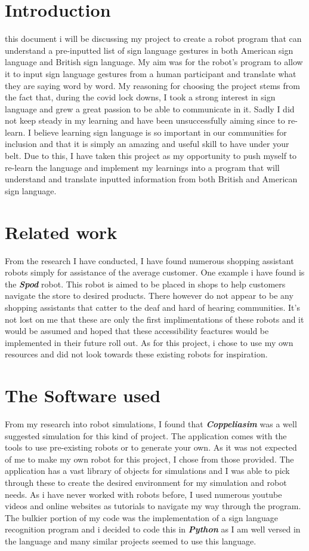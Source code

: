 \documentclass[lettersize,journal]{IEEEtran}
\begin{document}
\section{Introduction}
 this document i will be discussing my project to create a robot program that can understand a pre-inputted list of sign language gestures in both American sign language and British sign language. My aim was for the robot’s program to allow it to input sign language gestures from a human participant and translate what they are saying word by word. My reasoning for choosing the project stems from the fact that, during the covid lock downs, I took a strong interest in sign language and grew a great passion to be able to communicate in it. Sadly I did not keep steady in my learning and have been unsuccessfully aiming since to re-learn. I believe learning sign language is so important in our communities for inclusion and that it is simply an amazing and useful skill to have under your belt. Due to this, I have taken this project as my opportunity to push myself to re-learn the language and implement my learnings into a program that will understand and translate inputted information from both British and American sign language.  

\section{Related work}
From the research I have conducted, I have found numerous shopping assistant robots simply for assistance of the average customer. One example i have found is the \textbf{\textit{Spod}} robot. This robot is aimed to be placed in shops to help customers navigate the store to desired products. There however do not appear to be any shopping assistants that catter to the deaf and hard of hearing communities. It's not lost on me that these are only the first implimentations of these robots and it would be assumed and hoped that these accessibility feactures would be implemented in their  future roll out. As for this project, i chose to use my own resources and did not look towards these existing robots for inspiration.

\section{The Software used }

From my research into robot simulations, I found that \textbf{\textit{Coppeliasim}} was a well suggested simulation for this kind of project. The application comes with the tools to use pre-existing robots or to generate your own. As it was not expected of me to make my own robot for this project, I chose from those provided. The application has a vast library of objects for simulations and I was able to pick through these to create the desired environment for my simulation and robot needs. As i have never worked with robots before, I used numerous youtube videos and online websites as tutorials to navigate my way through the program. The bulkier portion of my code was the implementation of  a sign language recognition program and i decided to code this in \textbf{\textit{Python}} as I am well versed in the language and many similar projects seemed to use this language. 
\end{document}
